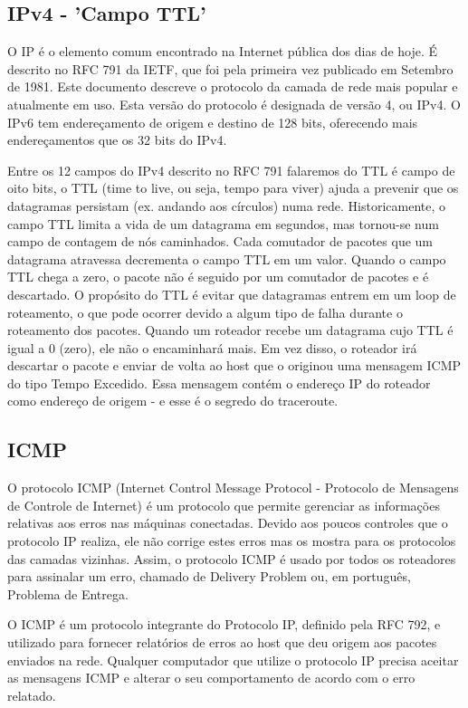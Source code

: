 \documentclass[
	article,			%
	11pt,				%
	oneside,			%
	a4paper,			%
	english,			%
	brazil,				%
	sumario=tradicional
	]{abntex2}
\begin{document}
\subsection{IPv4 - 'Campo TTL'}
O IP é o elemento comum encontrado na Internet pública dos dias de hoje. É descrito no RFC 791 da IETF, que foi pela primeira vez publicado em Setembro de 1981. Este documento descreve o protocolo da camada de rede mais popular e atualmente em uso. Esta versão do protocolo é designada de versão 4, ou IPv4. O IPv6 tem endereçamento de origem e destino de 128 bits, oferecendo mais endereçamentos que os 32 bits do IPv4.

Entre os 12 campos do IPv4 descrito no RFC 791 falaremos do TTL é campo de oito bits, o TTL (time to live, ou seja, tempo para viver) ajuda a prevenir que os datagramas persistam (ex. andando aos círculos) numa rede. Historicamente, o campo TTL limita a vida de um datagrama em segundos, mas tornou-se num campo de contagem de nós caminhados. Cada comutador de pacotes que um datagrama atravessa decrementa o campo TTL em um valor. Quando o campo TTL chega a zero, o pacote não é seguido por um comutador de pacotes e é descartado.
O propósito do TTL é evitar que datagramas entrem em um loop de roteamento, o que pode ocorrer devido a algum tipo de falha durante o roteamento dos pacotes. Quando um roteador recebe um datagrama cujo TTL é igual a 0 (zero), ele não o encaminhará mais. Em vez disso, o roteador irá descartar o pacote e enviar de volta ao host que o originou uma mensagem ICMP do tipo Tempo Excedido. Essa mensagem contém o endereço IP do roteador como endereço de origem - e esse é o segredo do traceroute.\cite{boson}


\subsection{ICMP}

O protocolo ICMP (Internet Control Message Protocol - Protocolo de Mensagens de Controle de Internet) é um protocolo que permite gerenciar as informações relativas aos erros nas máquinas conectadas. Devido aos poucos controles que o protocolo IP realiza, ele não corrige estes erros mas os mostra para os protocolos das camadas vizinhas. Assim, o protocolo ICMP é usado por todos os roteadores para assinalar um erro, chamado de Delivery Problem ou, em português, Problema de Entrega. 

O ICMP é um protocolo integrante do Protocolo IP, definido pela RFC 792, e utilizado para fornecer relatórios de erros ao host que deu origem aos pacotes enviados na rede. Qualquer computador que utilize o protocolo IP precisa aceitar as mensagens ICMP e alterar o seu comportamento de acordo com o erro relatado.
\end{document}
